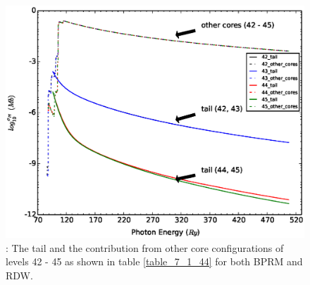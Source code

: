\begin{figure}
	\centering
	\includegraphics[width=.9\textwidth]{figures/fe18_mismatch_not_matter_tail_other.eps}
	\caption{: The tail and the contribution from other core configurations of levels 42 - 45 as shown in table \ref{table_7_1_44} for both BPRM and RDW. }
	\label{fig_7_1_44_not_matter_tail_other}
\end{figure}


